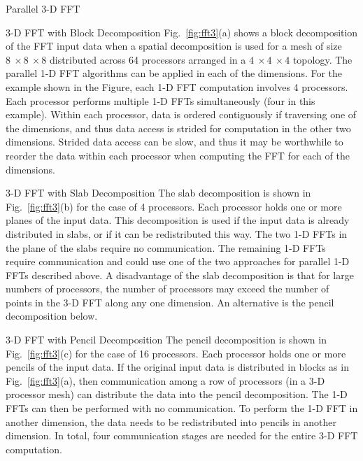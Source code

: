  {Parallel 3-D FFT}

 {3-D FFT with Block Decomposition}  
Fig.~\ref{fig:fft3}(a) shows a block decomposition of the FFT input
data when a spatial decomposition is used for a mesh of size $8~\times
8~\times 8$ distributed across 64 processors arranged in a $4~\times
4~\times 4$ topology.  The parallel 1-D FFT algorithms can be applied in
each of the dimensions.  For the example shown in the Figure, each 1-D
FFT computation involves 4 processors.  Each processor performs multiple
1-D FFTs simultaneously (four in this example).  Within each processor,
data is ordered contiguously if traversing one of the dimensions, and
thus data access is strided for computation in the other two dimensions.
Strided data access can be slow, and thus it may be worthwhile to reorder
the data within each processor when computing the FFT for each of the dimensions.

 {3-D FFT with Slab Decomposition}  
The slab decomposition is shown in 
Fig.~\ref{fig:fft3}(b) for the case of 4 processors.  Each processor holds
one or more planes of the input data.  This decomposition is used if
the input data is already distributed in slabs, or if it can be 
redistributed this way.  The two 1-D FFTs in the plane of the slabs
require no communication.  The remaining 1-D FFTs require communication
and could use one of the two approaches for parallel 1-D FFTs described above.  
A disadvantage
of the slab decomposition is that for large numbers of processors, the
number of processors may exceed the number of points in the 3-D FFT along
any one dimension.  An alternative is the pencil decomposition below.

 {3-D FFT with Pencil Decomposition}  
The pencil decomposition
is shown in Fig.~\ref{fig:fft3}(c) for the case of 16 processors.
Each processor holds one or more pencils of the input data.  If the
original input data is distributed in blocks as in Fig.~\ref{fig:fft3}(a),
then communication among a row of processors (in a 3-D processor mesh)
can distribute the data into the pencil decomposition.  The 1-D FFTs
can then be performed with no communication.  To perform the 1-D FFT in
another dimension, the data needs to be redistributed into pencils in
another dimension.  In total, four communication stages are needed for
the entire 3-D FFT computation.

